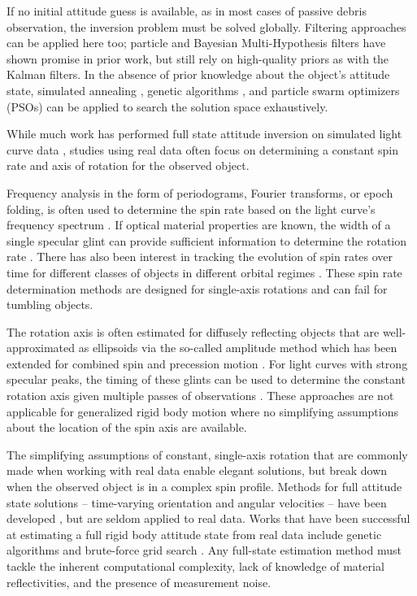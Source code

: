 \documentclass[a4paper,twocolumn]{spaceDebrisC} %
\begin{document}
If no initial attitude guess is available, as in most cases of passive debris observation, the inversion problem must be solved globally. Filtering approaches can be applied here too; particle \cite{linares2014particle, holzinger2014} and Bayesian Multi-Hypothesis filters \cite{burton2021two, cabrera2023} have shown promise in prior work, but still rely on high-quality priors as with the Kalman filters. In the absence of prior knowledge about the object's attitude state, simulated annealing \cite{gagnon2024, clark2020}, genetic algorithms \cite{gagnon2024, piergentili2017, clark2020}, and particle swarm optimizers (PSOs) \cite{clark2020, clark2022, burton2024journal, burton2024scitech, gagnon2024, gagnon2025} can be applied to search the solution space exhaustively.

While much work has performed full state attitude inversion on simulated light curve data \cite{burton2024journal, gagnon2024, robinson2025att}, studies using real data often focus on determining a constant spin rate and axis of rotation for the observed object.

Frequency analysis in the form of periodograms, Fourier transforms, or epoch folding, is often used to determine the spin rate based on the light curve's frequency spectrum \cite{silha2015, silha2021, isoletta2024, schildknecht2015, pittet2017, yanagisawa2012, koshkin2018}. If optical material properties are known, the width of a single specular glint can provide sufficient information to determine the rotation rate \cite{hinks2016}. There has also been interest in tracking the evolution of spin rates over time for different classes of objects in different orbital regimes \cite{koshkin2018, blacketer2022, karpov2016}. These spin rate determination methods are designed for single-axis rotations and can fail for tumbling objects.

The rotation axis is often estimated for diffusely reflecting objects that are well-approximated as ellipsoids via the so-called amplitude method \cite{williams1979location} which has been extended for combined spin and precession motion \cite{yanagisawa2012}. For light curves with strong specular peaks, the timing of these glints can be used to determine the constant rotation axis given multiple passes of observations \cite{vananti2023, koshkin2018}. These approaches are not applicable for generalized rigid body motion where no simplifying assumptions about the location of the spin axis are available.

The simplifying assumptions of constant, single-axis rotation that are commonly made when working with real data enable elegant solutions, but break down when the observed object is in a complex spin profile. Methods for full attitude state solutions -- time-varying orientation and angular velocities -- have been developed \cite{clark2022, burton2024journal, gagnon2024, linares2014particle}, but are seldom applied to real data. Works that have been successful at estimating a full rigid body attitude state from real data include genetic algorithms \cite{piergentili2020, gallucci2020} and brute-force grid search \cite{shafer2017}. Any full-state estimation method must tackle the inherent computational complexity, lack of knowledge of material reflectivities, and the presence of measurement noise.
\end{document}
